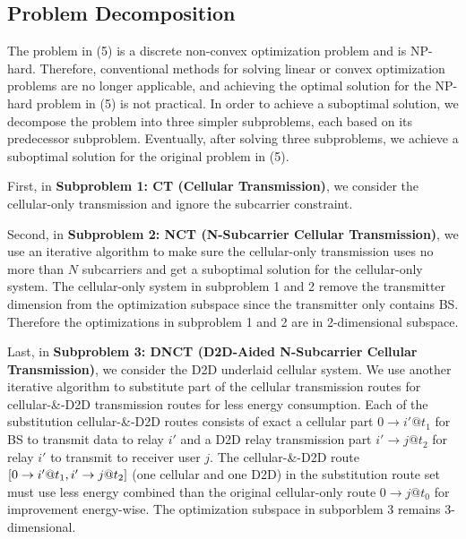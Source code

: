 \documentclass{ieeeaccess}
\begin{document}

\subsection{Problem Decomposition}

The problem in (5) is a discrete non-convex optimization problem and is NP-hard. Therefore, conventional methods for solving linear or convex optimization problems are no longer applicable, and achieving the optimal solution for the NP-hard problem in (5) is not practical. 
In order to achieve a suboptimal solution, we decompose the problem into three simpler subproblems, each based on its predecessor subproblem. Eventually, after solving three subproblems, we achieve a suboptimal solution for the original problem in (5).

First, in \textbf{Subproblem 1: CT (Cellular Transmission)}, we consider the cellular-only transmission and ignore the subcarrier constraint. 

Second, in \textbf{Subproblem 2: NCT (N-Subcarrier Cellular Transmission)}, we use an iterative algorithm to make sure the cellular-only transmission uses no more than $N$ subcarriers and get a suboptimal solution for the cellular-only system. The cellular-only system in subproblem 1 and 2 remove the transmitter dimension from the optimization subspace since the transmitter only contains BS. Therefore the optimizations in subproblem 1 and 2 are in 2-dimensional subspace.

Last, in \textbf{Subproblem 3: DNCT (D2D-Aided N-Subcarrier Cellular Transmission)}, we consider the D2D underlaid cellular system. We use another iterative algorithm to substitute part of the cellular transmission routes for cellular-\&-D2D transmission routes for less energy consumption. Each of the substitution cellular-\&-D2D routes consists of exact a cellular part $0 \to i'@{t_1}$ for BS to transmit data to relay ${i'}$ and a D2D relay transmission part $i' \to j@{t_2}$ for relay ${i'}$ to transmit to receiver user $j$. The cellular-\&-D2D route $\left[ {{\rm{0}} \to i'@{t_1},i' \to j@{t_2}} \right]$ (one cellular and one D2D) in the substitution route set must use less energy combined than the original cellular-only route $0 \to j@{t_0}$ for improvement energy-wise. The optimization subspace in subporblem 3 remains 3-dimensional.
\end{document}
